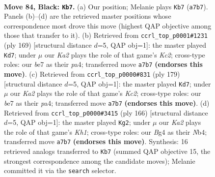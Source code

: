 \documentclass[11pt]{article}
\begin{document}
\clearpage

\begin{figure}[p]\centering
\begin{subfigure}{0.46\textwidth}\centering
\resizebox{\linewidth}{!}{%
\newchessgame
\chessboard[
  setfen={8/k3B3/8/8/p1p3b1/8/5K2/1N6 b - - 23 84},
  showmover=false,
  pgfstyle=straightmove, color=movearrow, markmove={a7-b7}
]}
\caption{}
\end{subfigure}\hfill
\begin{subfigure}{0.46\textwidth}\centering
\resizebox{\linewidth}{!}{%
\newchessgame
\chessboard[
  setfen={8/2k5/8/p7/P7/3N4/K3p3/8 b - - 15 85},
  showmover=false,
  pgfstyle=straightmove, color=movearrow, markmove={c7-d7}
]}
\caption{}
\end{subfigure}
\\[4pt]
\begin{subfigure}{0.46\textwidth}\centering
\resizebox{\linewidth}{!}{%
\newchessgame
\chessboard[
  setfen={8/2k5/8/p2K4/P7/3N4/4p3/8 b - - 47 90},
  showmover=false,
  pgfstyle=straightmove, color=movearrow, markmove={c7-d7}
]}
\caption{}
\end{subfigure}\hfill
\begin{subfigure}{0.46\textwidth}\centering
\resizebox{\linewidth}{!}{%
\newchessgame
\chessboard[
  setfen={8/4n3/4P3/6P1/1N6/8/4k3/7K w - - 5 84},
  showmover=false,
  pgfstyle=straightmove, color=movearrow, markmove={h1-g2}
]}
\caption{}
\end{subfigure}
\caption{\textbf{Move 84, Black: \texttt{Kb7}.} (a) Our position; Melanie plays \texttt{Kb7} (\texttt{a7b7}). Panels (b)--(d) are the retrieved master positions whose correspondence most drove this move (highest QAP objective among those that transfer to it). (b) Retrieved from \texttt{ccrl\_top\_p0001\#1231} (ply 169) [structural distance $d$=5, QAP obj=1]: the master played \texttt{Kd7}; under $\mu$ our \emph{Ka2} plays the role of that game's \emph{Kc2}; cross-type roles: our \emph{b}e7 as their \emph{p}a4; transferred move \texttt{a7b7} \textbf{(endorses this move)}. (c) Retrieved from \texttt{ccrl\_top\_p0000\#831} (ply 179) [structural distance $d$=5, QAP obj=1]: the master played \texttt{Kd7}; under $\mu$ our \emph{Ka2} plays the role of that game's \emph{Kc2}; cross-type roles: our \emph{b}e7 as their \emph{p}a4; transferred move \texttt{a7b7} \textbf{(endorses this move)}. (d) Retrieved from \texttt{ccrl\_top\_p0000\#3415} (ply 166) [structural distance $d$=5, QAP obj=1]: the master played \texttt{Kg2}; under $\mu$ our \emph{Ka2} plays the role of that game's \emph{Kh1}; cross-type roles: our \emph{B}g4 as their \emph{N}b4; transferred move \texttt{a7b7} \textbf{(endorses this move)}. Synthesis: 16 retrieved analogs transferred to \texttt{Kb7} (summed QAP objective 15, the strongest correspondence among the candidate moves); Melanie committed it via the \texttt{search} selector.}
\label{fig:thought-m167}
\end{figure}
\end{document}
